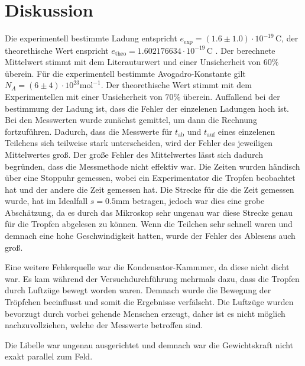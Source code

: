 \section{Diskussion}
\label{sec:diskussion}




Die experimentell bestimmte Ladung entspricht $e_{\text{exp}} = (1.6 \pm 1.0) \cdot 10^{-19} \, \mathrm{C}$, der
theorethische Wert enspricht $e_{\text{theo}} = 1.602176634 \cdot 10^{-19} \, \mathrm{C}$ . Der berechnete
Mittelwert stimmt mit dem Literauturwert und einer Unsicherheit von $60 \%$ überein. 
Für die experimentell bestimmte Avogadro-Konstante gilt $N_{\! A} = (6 \pm 4) \cdot 10^{23} \mathrm{mol}^{-1}$.
Der theorethische Wert stimmt mit dem Experimentellen mit einer Unsicherheit von $70\%$ überein.
Auffallend bei der bestimmung der Ladung ist, dass die Fehler der einzelenen Ladungen hoch ist. Bei den Messwerten wurde
zunächst gemittel, um dann die Rechnung fortzuführen. Dadurch, dass die Messwerte für $t_{\text{ab}}$ und $t_{\text{auf}}$ eines einzelenen Teilchens
sich teilweise stark unterscheiden, wird der Fehler des jeweiligen Mittelwertes groß. 
Der große Fehler des Mittelwertes lässt sich dadurch begründen, dass die Messmethode nicht effektiv war. Die Zeiten wurden
händisch über eine Stoppuhr gemessen, wobei ein Experimentator die Tropfen beobachtet hat und der andere
die Zeit gemessen hat. Die Strecke für die die Zeit gemessen wurde, hat im Idealfall $s = 0.5 \mathrm{mm}$ betragen, jedoch
war dies eine grobe Abschätzung, da es durch das Mikroskop sehr ungenau war diese Strecke genau für die Tropfen abgelesen
zu können. Wenn die Teilchen sehr schnell waren und demnach eine hohe Geschwindigkeit hatten, wurde der Fehler des
Ablesens auch groß. 

Eine weitere Fehlerquelle war die Kondensator-Kammmer, da diese nicht dicht war. Es kam während der Versuchdurchführung mehrmals
dazu, dass die Tropfen durch Luftzüge bewegt worden waren. Demnach wurde die Bewegung der Tröpfchen beeinflusst und somit 
die Ergebnisse verfälscht. Die Luftzüge wurden bevorzugt durch vorbei gehende Menschen erzeugt, daher ist es nicht 
möglich nachzuvollziehen, welche der Messwerte betroffen sind.

Die Libelle war ungenau ausgerichtet und demnach war die Gewichtskraft nicht exakt parallel zum Feld.


